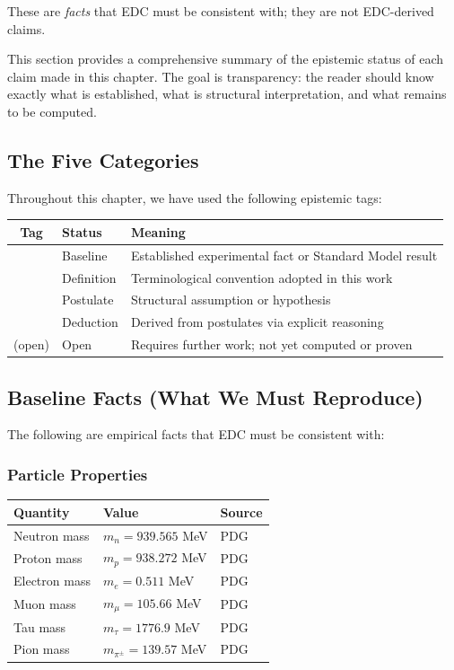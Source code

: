These are \emph{facts} that EDC must be consistent with; they are not EDC-derived
claims.

\vspace{1em}

This section provides a comprehensive summary of the epistemic status of each
claim made in this chapter. The goal is transparency: the reader should know
exactly what is established, what is structural interpretation, and what
remains to be computed.

\subsection{The Five Categories}

Throughout this chapter, we have used the following epistemic tags:

\begin{center}
\begin{tabular}{clp{8cm}}
\toprule
\textbf{Tag} & \textbf{Status} & \textbf{Meaning} \\
\midrule
\tagBL{} & Baseline & Established experimental fact or Standard Model result \\
 & Definition & Terminological convention adopted in this work \\
\tagP{} & Postulate & Structural assumption or hypothesis \\
\tagDc{} & Deduction & Derived from postulates via explicit reasoning \\
(open) & Open & Requires further work; not yet computed or proven \\
\bottomrule
\end{tabular}
\end{center}

\subsection{Baseline Facts (What We Must Reproduce)}

The following are empirical facts that EDC must be consistent with:

\subsubsection{Particle Properties}

\begin{center}
\begin{tabular}{lll}
\toprule
\textbf{Quantity} & \textbf{Value} & \textbf{Source} \\
\midrule
Neutron mass & $m_n = 939.565$ MeV & PDG \\
Proton mass & $m_p = 938.272$ MeV & PDG \\
Electron mass & $m_e = 0.511$ MeV & PDG \\
Muon mass & $m_\mu = 105.66$ MeV & PDG \\
Tau mass & $m_\tau = 1776.9$ MeV & PDG \\
Pion mass & $m_{\pi^\pm} = 139.57$ MeV & PDG \\
\bottomrule
\end{tabular}
\end{center}

